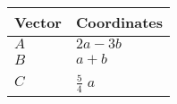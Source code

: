 \begin{tabular}{|m{5em}|m{10em}|}
    \hline
    \textbf{Vector} &\textbf{Coordinates} \\
    \hline
         $A$ & $2a-3b$ \\
    \hline
        $B$ & $a+b$ \\
    \hline
	$C$ & $\frac{5}{4}$ $a$ \\
    \hline
\end{tabular}
